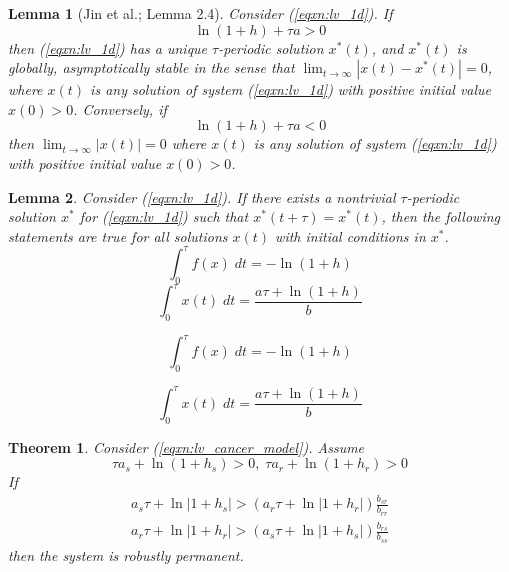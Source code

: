 \documentclass[10pt,a4paper]{amsart}
\newtheorem{theorem}{Theorem}
\newtheorem{lemma}{Lemma}
\begin{document}
\begin{lemma}[Jin et al.; Lemma 2.4]\label{lemma:jin_1d_periodic_soln}
    Consider (\ref{eqxn:lv_1d}). If
    \begin{equation*}
        \ln{(1+h) + \tau a > 0}
    \end{equation*}
    then (\ref{eqxn:lv_1d}) has a unique $\tau$-periodic solution $x^*(t)$, and $x^*(t)$ is globally, asymptotically stable in the sense that $\lim_{t \to \infty}|x(t) - x^*(t)| = 0$, where $x(t)$ is any solution of system (\ref{eqxn:lv_1d}) with positive initial value $x(0) > 0$. Conversely, if
    \begin{equation*}
        \ln{(1+h) + \tau a < 0}
    \end{equation*}
    then $\lim_{t \to \infty}|x(t)| = 0$ where $x(t)$ is any solution of system (\ref{eqxn:lv_1d}) with positive initial value $x(0) > 0$.
\end{lemma}

\begin{lemma}\label{lemma:periodic_integral_of_lv_1d}
    Consider (\ref{eqxn:lv_1d}). If there exists a nontrivial $\tau$-periodic solution $x^*$ for (\ref{eqxn:lv_1d}) such that $x^*(t + \tau) = x^*(t)$, then the following statements are true for all solutions $x(t)$ with initial conditions in $x^*$.
    \begin{equation}\label{eqxn:periodic_integral_of_f}
        \int_0^\tau f(x) \; dt = -\ln{(1 + h)}
    \end{equation}
    \begin{equation}\label{eqxn:periodic_integral_of_x}
        \int_0^\tau x(t) \; dt = \frac{a\tau  + \ln{(1+h)}}{b} 
    \end{equation}
           
\end{lemma}

    \begin{equation}
        \int_0^\tau f(x) \; dt = -\ln{(1 + h)}
    \end{equation}

    \begin{equation}
        \int_0^\tau x(t) \; dt = \frac{a\tau  + \ln{(1+h)}}{b} 
    \end{equation}

\begin{theorem}
    Consider (\ref{eqxn:lv_cancer_model}). Assume
    \begin{equation}\label{eqxn:lv_cancer_model_permanence_req_1}
        \tau a_s + \ln{(1 + h_s)} > 0 , \; \tau a_r + \ln{(1 + h_r)} > 0
    \end{equation}
    If 
    \begin{equation}\label{eqxn:lv_cancer_model_permanence_req_2}
        \begin{split}
            a_s\tau + \ln{|1+h_s|} > \left(a_r\tau + \ln{|1 + h_r|}\right)\frac{b_{sr}}{b_{rr}}\\
            a_r\tau + \ln{|1+h_r|} > \left(a_s\tau + \ln{|1 + h_s|}\right)\frac{b_{rs}}{b_{ss}}
        \end{split}
    \end{equation}
    then the system is robustly permanent.
\end{theorem}
\end{document}
